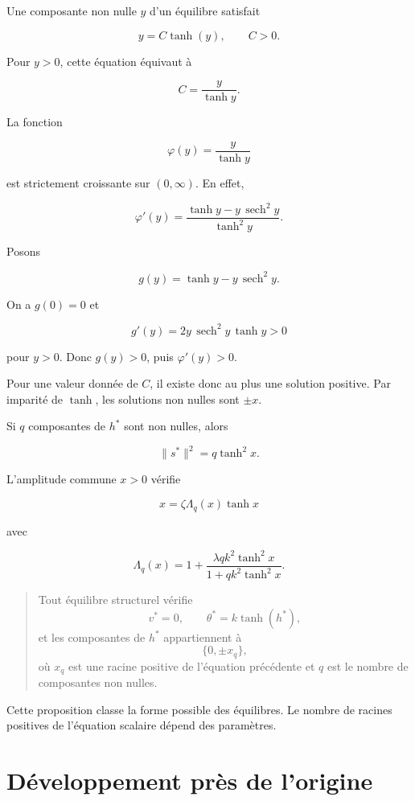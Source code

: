 Une composante non nulle \(y\) d'un équilibre satisfait

\[
y=C\tanh(y),
\qquad
C>0.
\]

Pour \(y>0\), cette équation équivaut à

\[
C=\frac{y}{\tanh y}.
\]

La fonction

\[
\varphi(y)=\frac{y}{\tanh y}
\]

est strictement croissante sur \((0,\infty)\). En effet,

\[
\varphi'(y)
=
\frac{\tanh y-y\,\operatorname{sech}^2y}
{\tanh^2y}.
\]

Posons

\[
g(y)
=
\tanh y-y\,\operatorname{sech}^2y.
\]

On a \(g(0)=0\) et

\[
g'(y)
=
2y\,\operatorname{sech}^2y\,\tanh y
>0
\]

pour \(y>0\). Donc \(g(y)>0\), puis \(\varphi'(y)>0\).

Pour une valeur donnée de \(C\), il existe donc au plus une solution
positive. Par imparité de \(\tanh\), les solutions non nulles sont
\(\pm x\).

Si \(q\) composantes de \(h^\ast\) sont non nulles, alors

\[
\|s^\ast\|^2
=
q\tanh^2x.
\]

L'amplitude commune \(x>0\) vérifie

\[
\boxed{
x
=
\zeta\Lambda_q(x)\tanh x
}
\]

avec

\[
\boxed{
\Lambda_q(x)
=
1+
\frac{\lambda qk^2\tanh^2x}
{1+qk^2\tanh^2x}.
}
\]

\begin{quote}
Tout équilibre structurel vérifie
\[
v^\ast=0,
\qquad
\theta^\ast=k\tanh(h^\ast),
\]
et les composantes de \(h^\ast\) appartiennent à
\[
\{0,\pm x_q\},
\]
où \(x_q\) est une racine positive de l'équation précédente et \(q\)
est le nombre de composantes non nulles.
\end{quote}

Cette proposition classe la forme possible des équilibres. Le nombre
de racines positives de l'équation scalaire dépend des paramètres.

\section{Développement près de l'origine}
\label{annexe-reduction-developpement-origine}

